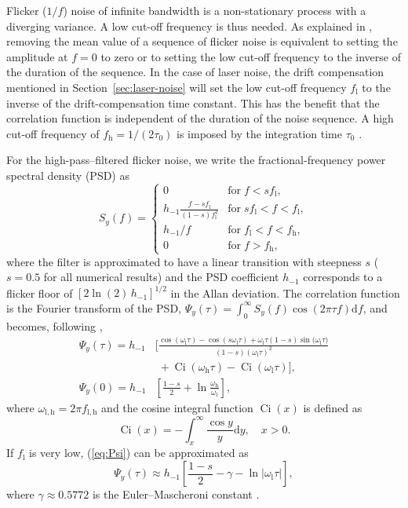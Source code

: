 \documentclass[10pt,a4paper]{iopart}
\DeclareMathOperator{\Ci}{Ci}
\newcommand{\eqref}[1]{(\ref{#1})}
\begin{document}
Flicker ($1/f$) noise of infinite bandwidth is a non-stationary process with a diverging variance. A low cut-off frequency is thus needed. As explained in \cite{Vernotte2015b}, removing the mean value of a sequence of flicker noise is equivalent to setting the amplitude at $f=0$ to zero or to setting the low cut-off frequency to the inverse of the duration of the sequence. In the case of laser noise, the drift compensation mentioned in Section~\ref{sec:laser-noise} will set the low cut-off frequency $f_\mathrm{l}$ to the inverse of the drift-compensation time constant. This has the benefit that the correlation function is independent of the duration of the noise sequence. A high cut-off frequency of $f_\mathrm{h} = 1/(2 \tau_0)$ is imposed by the integration time $\tau_0$ \cite{Vernotte2015b}.

For the high-pass--filtered flicker noise, we write the fractional-frequency power spectral density (PSD) as
\begin{equation} \label{eq:Sy}
S_y(f) = \left\{
    \begin{array}{ll}
    0 & \mathrm{for}\; f < s f_\mathrm{l}, \\
    h_{-1} \frac{f-s f_\mathrm{l}}{(1-s) f_\mathrm{l}^2} & \mathrm{for}\; s f_\mathrm{l} < f < f_\mathrm{l}, \\
    h_{-1}/f & \mathrm{for}\; f_\mathrm{l} < f < f_\mathrm{h}, \\
    0 & \mathrm{for}\; f > f_\mathrm{h},
    \end{array}
    \right.
\end{equation}
where the filter is approximated to have a linear transition with steepness $s$ ($s=0.5$ for all numerical results) and the PSD coefficient $h_{-1}$ corresponds to a flicker floor of $[2 \ln{(2)} \, h_{-1}]^{1/2}$ in the Allan deviation.
The correlation function is the Fourier transform of the PSD, $\Psi_y(\tau) = \int_0^\infty S_y(f) \cos{(2 \pi\tau f)} \mathrm{d}f$, and becomes, following \cite{Vernotte2015b},
\begin{eqnarray}
\Psi_y(\tau) = h_{-1} & \bigg[ \frac{\cos{(\omega_\mathrm{l}\tau)} - \cos{(s \omega_\mathrm{l}\tau)} +
    \omega_\mathrm{l}\tau (1-s) \sin{(\omega_\mathrm{l}\tau})}{(1-s)(\omega_\mathrm{l}\tau)^2} \nonumber \\
    & \; + \Ci{(\omega_\mathrm{h}\tau)} - \Ci{(\omega_\mathrm{l}\tau)} \bigg], \label{eq:Psi} \\
\Psi_y(0) = h_{-1} & \left[ \frac{1-s}{2} + \ln{\frac{\omega_\mathrm{h}}{\omega_\mathrm{l}}} \right], \label{eq:Psi0}
\end{eqnarray}
where $\omega_\mathrm{l,h} = 2\pi f_\mathrm{l,h}$ and the cosine integral function $\Ci{(x)}$ is defined as
\begin{equation}
\Ci{(x)} = -\int_x^\infty \frac{\cos{y}}{y} \mathrm{d}y, \quad x>0.
\end{equation}
If $f_\mathrm{l}$ is very low, \eqref{eq:Psi} can be approximated as
\begin{equation} \label{eq:Psi_appr}
\Psi_y(\tau) \approx h_{-1} \left[ \frac{1-s}{2} -\gamma - \ln{|\omega_\mathrm{l}\tau|} \right],
\end{equation}
where $\gamma \approx 0.5772$ is the Euler--Mascheroni constant \cite{Vernotte2015b}.
\end{document}
